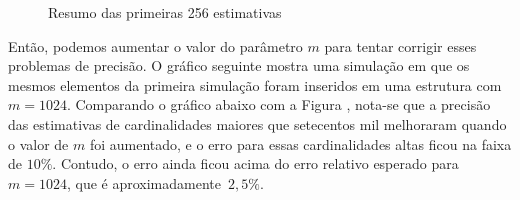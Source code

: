 \begin{figure}
  \centering
  \qquad
  \caption{Resumo das primeiras 256 estimativas}
  \label{fig:pcounting:64:first}
\end{figure}

Então, podemos aumentar o valor do parâmetro $m$ para tentar corrigir esses problemas de precisão. O gráfico seguinte 
mostra uma simulação em que os mesmos elementos da primeira simulação foram inseridos em uma estrutura com $m = 1024$.
Comparando o gráfico abaixo com a Figura , nota-se que a precisão das estimativas de 
cardinalidades maiores que setecentos mil melhoraram quando o valor de $m$ foi aumentado, e o erro para essas 
cardinalidades altas ficou na faixa de $10\%$. Contudo, o erro ainda ficou acima do erro relativo esperado para 
$m = 1024$, que é aproximadamente~$2{,}5\%$.

